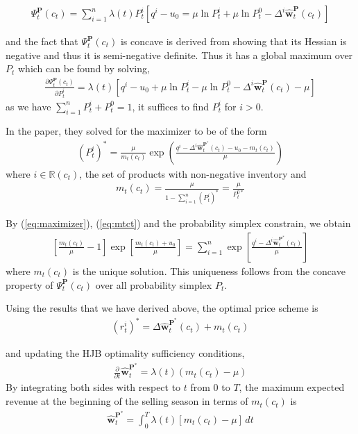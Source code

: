 \begin{align*}
\Psi_t^{\mathbf{P}}(c_t) = \sum_{i=1}^{n}\lambda(t) P_t^i\left[q^i - u_0 = \mu \ln P_t^i + \mu \ln P_t^0 - \Delta^i\hat{\mathbf{w}}_t^{\mathbf{P}}(c_t)\right]
\end{align*}

and the fact that $\Psi_t^{\mathbf{P}}(c_t)$ is concave is derived from showing that its Hessian is negative and thus it is semi-negative definite. Thus it has a global maximum over $P_t$ which can be found by solving,
\begin{align}
\frac{\partial \Psi_t^{\mathbf{P}}(c_t)}{\partial P_t^i} = \lambda(t) \left[q^i - u_0 + \mu \ln P_t^i - \mu \ln P_t^0 - \Delta^i \hat{\mathbf{w}}_t^{\mathbf{P}}(c_t)-\mu\right]
\end{align}
as we have $\sum_{i=1}^{n}P_t^i + P_t^0 = 1$, it suffices to find $P_t^i$ for $i>0$. 

In the paper, they solved for the maximizer to be of the form
\begin{align}
(P_t^i)^\ast = \frac{\mu}{m_t(c_t)}\exp \left(\frac{q^i-\Delta^i \hat{\mathbf{w}}_t^{\mathbf{P}^\ast}(c_t)-u_0 - m_t(c_t)}{\mu}\right)\label{eq:maximizer}
\end{align}
where $i \in \mathbb{R}(c_t)$, the set of products with non-negative inventory and 
\begin{align}
m_t(c_t) = \frac{\mu}{1 - \sum_{i=1}^{n}(P_t^i)^\ast} = \frac{\mu}{P_t^{0\ast}}\label{eq:mtct}
\end{align}

By (\ref{eq:maximizer}), (\ref{eq:mtct}) and the probability simplex constrain, we obtain
\begin{align}
\left[\frac{m_t(c_t)}{\mu}-1\right] \exp \left[\frac{m_t(c_t)+u_0}{\mu}\right] = \sum_{i=1}^{n}\exp \left[\frac{q^i-\Delta^i \hat{\mathbf{w}}_t^{\mathbf{P}^\ast}(c_t)}{\mu}\right]\label{eq:uniquesol}
\end{align}
where $m_t(c_t)$ is the unique solution. This uniqueness follows from the concave property of $\Psi_t^{\mathbf{P}}(c_t)$ over all probability simplex $P_t$.

Using the results that we have derived above, the optimal price scheme is
\begin{align}
(r_t^i)^\ast = \Delta \hat{\mathbf{w}}_t^{\mathbf{P}^\ast}(c_t)+m_t(c_t)\label{eq:optpricescheme}
\end{align}

and updating the HJB optimality sufficiency conditions,
\begin{align}
\frac{\partial}{\partial t}\hat{\mathbf{w}}_t^{\mathbf{P}^\ast} = \lambda(t)(m_t(c_t) - \mu)\label{eq:pdw}
\end{align}
By integrating both sides with respect to $t$ from $0$ to $T$,  the maximum expected revenue at the beginning of the selling season in terms of $m_t(c_t)$ is 
\begin{align}
\hat{\mathbf{w}}_t^{\mathbf{P}^\ast} = \int_{0}^{T}\lambda(t)\left[m_t(c_t)-\mu\right]\,dt
\end{align}


